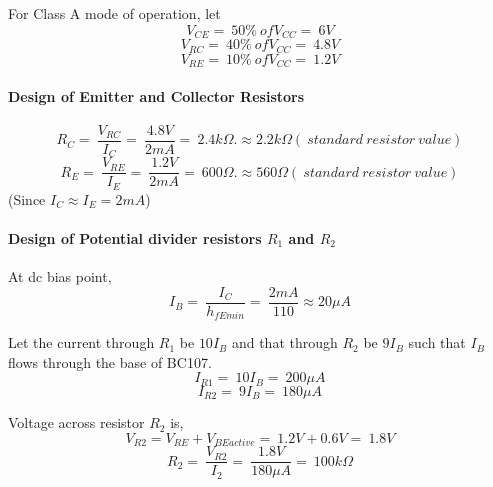 \documentclass{book}
\begin{document}
\noindent For Class A mode of operation, let
\begin{equation}
V_{CE}=\ 50\% \ of V_{CC}=\ 6 V
\end{equation}
\begin{equation}
V_{RC}=\ 40\% \ of V_{CC}=\ 4.8 V
\end{equation}
\begin{equation}
V_{RE}=\ 10\% \ of V_{CC}=\ 1.2 V
\end{equation}

 \paragraph{Design of Emitter and Collector Resistors}
 
\begin{equation}
R_C=\ \frac{V_{RC}}{I_C}=\ \frac{4.8V}{2mA}=\ 2.4 k \Omega. \approx 2.2k\Omega (\ standard \ resistor\  value)
\end{equation}
\begin{equation}
R_E=\ \frac{V_{RE}}{I_E}=\ \frac{1.2V}{2mA}=\ 600 \Omega. \approx 560\Omega (\ standard \ resistor \ value)
\end{equation}
\noindent (Since $I_C \approx I_E =2mA$)

\paragraph{Design of Potential divider resistors $R_1$ and $R_2$ \\}
\noindent At dc bias point,
\begin{equation}
I_B=\ \frac{I_C}{h_{fEmin}}=\ \frac{2mA}{110} \approx 20 \mu A
\end{equation}

\noindent Let the current through $R_1$ be $10I_B$ and that through $R_2$ be $9I_B$ such that $I_B$ flows through the base of BC107.
\begin{equation}
I_{R1}=\ 10I_B=\ 200 \mu A
\end{equation}
\begin{equation}
I_{R2}=\ 9I_B=\ 180 \mu A
\end{equation}



\noindent Voltage across resistor $R_2$ is,
\begin{equation}
V_{R2}= V_{RE} +V_{BEactive} =\ 1.2V+0.6V=\ 1.8 V
\end{equation}
 \begin{equation}
R_2=\ \frac{V_{R2}}{I_2}= \ \frac{1.8V}{180 \mu A}=\ 100k\Omega
\end{equation}
\end{document}
